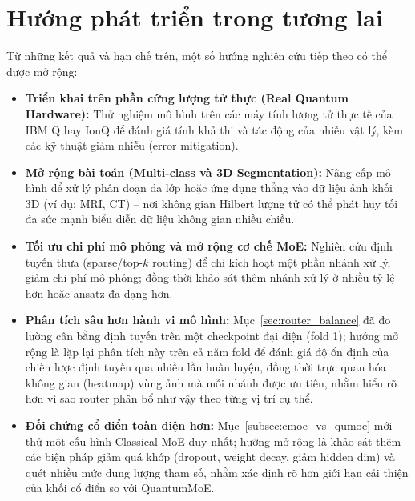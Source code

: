 \section{Hướng phát triển trong tương lai}
Từ những kết quả và hạn chế trên, một số hướng nghiên cứu tiếp theo có thể được mở rộng:
\begin{itemize}
    \item \textbf{Triển khai trên phần cứng lượng tử thực (Real Quantum Hardware):} Thử nghiệm mô hình trên các máy tính lượng tử thực tế của IBM Q hay IonQ để đánh giá tính khả thi và tác động của nhiễu vật lý, kèm các kỹ thuật giảm nhiễu (error mitigation).
    \item \textbf{Mở rộng bài toán (Multi-class và 3D Segmentation):} Nâng cấp mô hình để xử lý phân đoạn đa lớp hoặc ứng dụng thẳng vào dữ liệu ảnh khối 3D (ví dụ: MRI, CT) -- nơi không gian Hilbert lượng tử có thể phát huy tối đa sức mạnh biểu diễn dữ liệu không gian nhiều chiều.
    \item \textbf{Tối ưu chi phí mô phỏng và mở rộng cơ chế MoE:} Nghiên cứu định tuyến thưa (sparse/top-$k$ routing) để chỉ kích hoạt một phần nhánh xử lý, giảm chi phí mô phỏng; đồng thời khảo sát thêm nhánh xử lý ở nhiều tỷ lệ hơn hoặc ansatz đa dạng hơn.
    \item \textbf{Phân tích sâu hơn hành vi mô hình:} Mục~\ref{sec:router_balance} đã đo lường cân bằng định tuyến trên một checkpoint đại diện (fold 1); hướng mở rộng là lặp lại phân tích này trên cả năm fold để đánh giá độ ổn định của chiến lược định tuyến qua nhiều lần huấn luyện, đồng thời trực quan hóa không gian (heatmap) vùng ảnh mà mỗi nhánh được ưu tiên, nhằm hiểu rõ hơn vì sao router phân bổ như vậy theo từng vị trí cụ thể.
    \item \textbf{Đối chứng cổ điển toàn diện hơn:} Mục~\ref{subsec:cmoe_vs_qumoe} mới thử một cấu hình Classical MoE duy nhất; hướng mở rộng là khảo sát thêm các biện pháp giảm quá khớp (dropout, weight decay, giảm hidden dim) và quét nhiều mức dung lượng tham số, nhằm xác định rõ hơn giới hạn cải thiện của khối cổ điển so với QuantumMoE.
\end{itemize}
